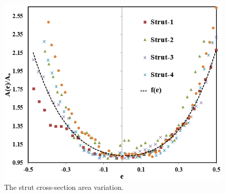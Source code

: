 \documentclass[review]{elsarticle}
\begin{document}
\begin{figure}[hb]
  \centering
  \includegraphics[scale=0.8]{StrutCrossSection}
  \captionsetup{justification=centering}
  \caption[Close up of \textit{Hemidactylus} sp. ]
   {The strut cross-section area variation.}
  \label{fig:StrutCrossSection}
\end{figure}
\end{document}
